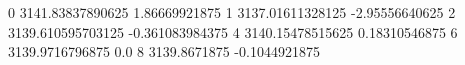 0 3141.83837890625 1.86669921875
1 3137.01611328125 -2.95556640625
2 3139.610595703125 -0.361083984375
4 3140.15478515625 0.18310546875
6 3139.9716796875 0.0
8 3139.8671875 -0.1044921875
